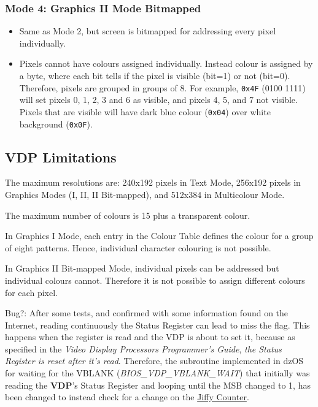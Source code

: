         \subsubsection{Mode 4: \textbf{Graphics II Mode Bitmapped}}
        \begin{itemize}
            \item Same as Mode 2, but screen is bitmapped for addressing every
                pixel individually.
            \item Pixels cannot have colours assigned individually. Instead
                colour is assigned by a byte, where each bit tells if the pixel
                is visible (bit=1) or not (bit=0). Therefore, pixels are grouped
                in groups of 8. For example, \texttt{0x4F} (0100 1111) will set
                pixels 0, 1, 2, 3 and 6 as visible, and pixels 4, 5, and 7 not
                visible. Pixels that are visible will have dark blue colour
                (\texttt{0x04}) over white background (\texttt{0x0F}).
        \end{itemize}

    \subsection{VDP Limitations}
    \label{subsec:vdp_limitations}

    The maximum resolutions are: 240x192 pixels in Text Mode, 256x192 pixels in
    Graphics Modes (I, II, II Bit-mapped), and 512x384 in Multicolour Mode.

    The maximum number of colours is 15 plus a transparent colour.

    In Graphics I Mode, each entry in the Colour Table defines the colour for
    a group of eight patterns. Hence, individual character colouring is not
    possible.

    In Graphics II Bit-mapped Mode, individual pixels can be addressed but
    individual colours cannot. Therefore it is not possible to assign different
    colours for each pixel.

    Bug?: After some tests, and confirmed with some information found on the
    Internet, reading continuously the Status Register can lead to miss the flag.
    This happens when the register is read and the VDP is about to set it,
    because as specified in the \textit{Video Display Processors Programmer's
    Guide}\cite{ti1}, \textit{the Status Register is reset after it's read}.
    Therefore, the subroutine implemented in dzOS for waiting for the VBLANK
    (\textit{BIOS\_VDP\_VBLANK\_WAIT}) that initially was reading the
    \textbf{VDP}'s Status Register and looping until the MSB changed to 1, has
    been changed to instead check for a change on the
    \hyperref[subsec:jiffy_counter]{Jiffy Counter}.


